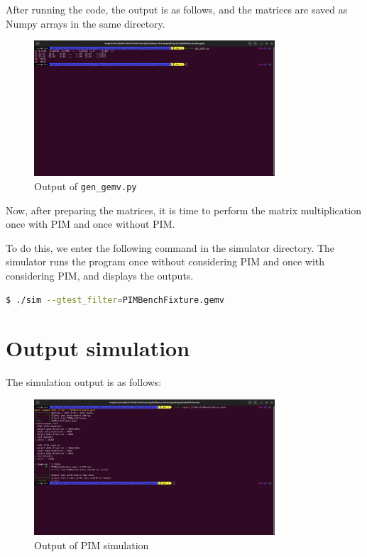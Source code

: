 \documentclass[12pt]{article}
\begin{document}
After running the code, the output is as follows, and the matrices are saved as Numpy arrays in the same directory.

\begin{figure}[h]
	\centering
	\includegraphics[width=0.8\textwidth]{Images/img6.png}
	\caption{Output of \texttt{gen\_gemv.py}}
	\label{fig:Output of gen_gemv.py}
\end{figure}


Now, after preparing the matrices, it is time to perform the matrix multiplication once with PIM and once without PIM.

To do this, we enter the following command in the simulator directory.
The simulator runs the program once without considering PIM and once with considering PIM, and displays the outputs.

\begin{lstlisting}[language=bash]
	$ ./sim --gtest_filter=PIMBenchFixture.gemv
\end{lstlisting}


\newpage










\section{Output simulation}
The simulation output is as follows:
\begin{figure}[h]
	\centering
	\includegraphics[width=0.8\textwidth]{Images/img7.png}
	\caption{Output of PIM simulation}
	\label{fig:Output of PIM simulation}
\end{figure}
\end{document}
